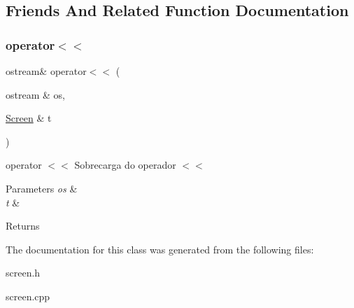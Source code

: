 \subsection{Friends And Related Function Documentation}
\mbox{\label{classScreen_aab6a2880746bfe1b7964817cc8f0989e}} 
\subsubsection{\texorpdfstring{operator$<$$<$}{operator<<}}
{\footnotesize\ttfamily ostream\& operator$<$$<$ (\begin{DoxyParamCaption}\item[{ostream \&}]{os,  }\item[{\hyperlink{classScreen}{Screen} \&}]{t }\end{DoxyParamCaption})\hspace{0.3cm}{\ttfamily [friend]}}



operator $<$$<$ Sobrecarga do operador $<$$<$ 


\begin{DoxyParams}{Parameters}
{\em os} & \\
\hline
{\em t} & \\
\hline
\end{DoxyParams}
\begin{DoxyReturn}{Returns}

\end{DoxyReturn}


The documentation for this class was generated from the following files\+:\begin{DoxyCompactItemize}
\item 
screen.\+h\item 
screen.\+cpp\end{DoxyCompactItemize}
